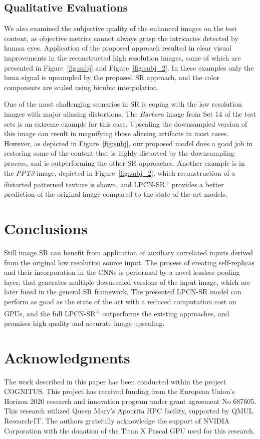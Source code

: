 \documentclass[10pt,twocolumn,letterpaper]{article}
\begin{document}
\subsection{Qualitative Evaluations}
\label{sec:subjective}
We also examined the subjective quality of the enhanced images on the test content, as objective metrics cannot always
grasp the intricacies detected by human eyes. Application of the proposed approach resulted in clear visual 
improvements in the reconstructed high resolution images, some of which are presented in Figure~\ref{fig:subj} and Figure~\ref{fig:subj_2}.
In these examples only the luma signal is upsampled by the proposed SR approach, and the color components
are scaled using bicubic interpolation. 

One of the most challenging scenarios in SR is coping with the low resolution images with major aliasing 
distortions. The \emph{Barbara} image from Set 14 of the test sets is an extreme example for this case. Upscaling 
the downsampled version of this image can result in magnifying those aliasing artifacts in most cases. However, as
depicted in Figure~\ref{fig:subj}, our proposed model does a good job in restoring some of the content that is
highly distorted by the downsampling process, and is outperforming the other SR approaches. Another example is
in the \emph{PPT3} image, depicted in Figure~\ref{fig:subj_2}, which reconstruction of a distorted patterned 
texture is shown, and LPCN-SR\textsuperscript{+} provides a better prediction of the original image compared to 
the state-of-the-art models.


\section{Conclusions}
\label{conc}
Still image SR can benefit from application of auxiliary correlated inputs derived from the 
original low resolution source input. The process of creating self-replicas and their incorporation in 
the CNNs is performed by a novel lossless pooling layer, that generates multiple downscaled
versions of the input image, which are later fused in the general SR framework. The presented
LPCN-SR model can perform as good as the state of the art with a reduced computation cost on 
GPUs, and the full LPCN-SR\textsuperscript{+} outperforms the existing approaches, and promises
high quality and accurate image upscaling.

\section*{Acknowledgments}
The work described in this paper has been conducted within the project
COGNITUS. This project has received funding from the European Union’s
Horizon 2020 research and innovation program under grant agreement No
687605. This research utilized Queen Mary's Apocrita HPC facility,
supported by QMUL Research-IT. The authors gratefully acknowledge the support of NVIDIA 
Corporation with the donation of the Titan X Pascal GPU used for this research.


{\small


}
\end{document}
